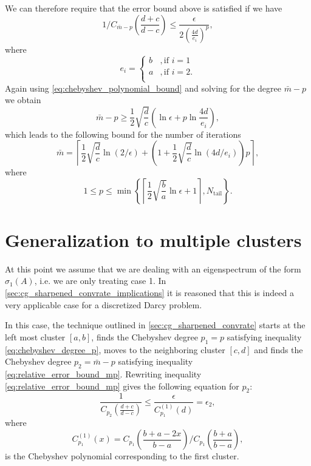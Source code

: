 We can therefore require that the error bound above is satisfied if we have
\[
    1/C_{\bar{m}-p}\left(\frac{d+c}{d-c}\right) \leq \frac{\epsilon}{2\left( \frac{4d}{e_i}\right)^p},
\]
where 
\[
    e_i = \begin{cases}
        b &, \text{if } i = 1\\
        a &, \text{if } i = 2.\\
    \end{cases}
\]
Again using \cref{eq:chebyshev_polynomial_bound} and solving for the degree $\bar{m} - p$ we obtain
\[
    \bar{m} - p \geq \frac{1}{2}\sqrt{\frac{d}{c}}\left(\ln{\epsilon} + p \ln{\frac{4d}{e_i}}\right),
\]
which leads to the following bound for the number of iterations \cite[Equation 4.4]{cg_sharpened_convrate_Axelsson1976}
\begin{equation}
    \bar{m}=\left\lceil\frac{1}{2} \sqrt{\frac{d}{c}} \ln (2 / \epsilon)+\left(1+\frac{1}{2} \sqrt{\frac{d}{c}} \ln (4 d / e_i)\right) p\right\rceil,
    \label{eq:cg_iteration_bound_2_clusters}
\end{equation}
where 
\[
    1 \leq p \leq \min\left\{\left\lceil\frac{1}{2}\sqrt{\frac{b}{a}}\ln{\epsilon} + 1\right\rceil, N_{\text{tail}}\right\}.
\]

\section{Generalization to multiple clusters}\label{sec:multiple_clusters}
At this point we assume that we are dealing with an eigenspectrum of the form $\sigma_1(A)$, i.e. we are only treating case 1. In \cref{sec:cg_sharpened_convrate_implications} it is reasoned that this is indeed a very applicable case for a discretized Darcy problem.

In this case, the technique outlined in \cref{sec:cg_sharpened_convrate} starts at the left most cluster $[a,b]$, finds the Chebyshev degree $p_1=p$ satisfying inequality \ref{eq:chebyshev_degree_p}, moves to the neighboring cluster $[c,d]$ and finds the Chebyshev degree $p_2 = \bar{m} - p$ satisfying inequality \ref{eq:relative_error_bound_mp}. Rewriting inequality \ref{eq:relative_error_bound_mp} gives the following equation for $p_2$:
\begin{equation}
    \frac{1}{C_{p_2}\left(\frac{d+c}{d-c}\right)} \leq \frac{\epsilon}{{C}^{(1)}_{p_1}(d)} = \epsilon_2,
    \label{eq:chebyshev_degree_p_prime}
\end{equation}
where
\[
    C^{(1)}_{p_1}(x) = C_{p_1}\left(\frac{b + a - 2x}{b - a}\right) /C_{p_1}\left(\frac{b+a}{b-a}\right),
\]
is the Chebyshev polynomial corresponding to the first cluster.

